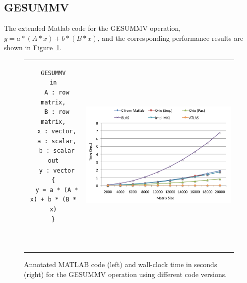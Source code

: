 \documentclass[11pt]{article}
\begin{document}
\subsection{GESUMMV}




The extended Matlab code for the GESUMMV operation, $y = a * (A * x) + b * (B * x)$,
and the corresponding performance results are shown in Figure~\ref{fig:gesummv}.



\begin{figure}[htp]
\centering
\begin{tabular}{cc}
\begin{minipage}[b]{.3\textwidth}
\footnotesize
\begin{verbatim}
GESUMMV
in
  A : row matrix,
  B : row matrix,
  x : vector,
  a : scalar,
  b : scalar
out
  y : vector
{
  y = a * (A * x) + b * (B * x)
}



\end{verbatim}
\end{minipage}
&
\begin{minipage}[b]{.6\textwidth}
\includegraphics[width=\textwidth]{figures/gesummv.png}
\end{minipage}\\
\end{tabular}
\caption{Annotated MATLAB code (left) and wall-clock time in seconds (right) for the GESUMMV operation using different code versions.}
\label{fig:gesummv}
\end{figure}
\end{document}
